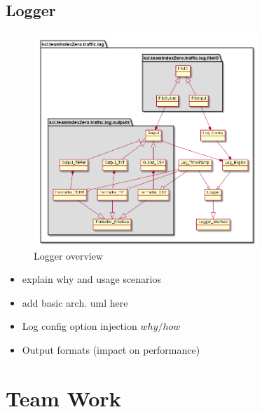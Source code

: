 \subsection{Logger}
\begin{figure}
	\vspace{1.5em}
  	\caption{Logger overview}
  	\label{fig:logger_overview}
  	\centering
	\includegraphics[width=0.75\textwidth]{figs/logger/LogModuleObjectDiagram.png}
  	\vspace{1.5em}
\end{figure}

    \begin{itemize}
        \item explain why and usage scenarios
        \item add basic arch. uml here
        \item Log config option injection \(why/how\)
        \item Output formats (impact on performance)
    \end{itemize}
    

\section{Team Work}

